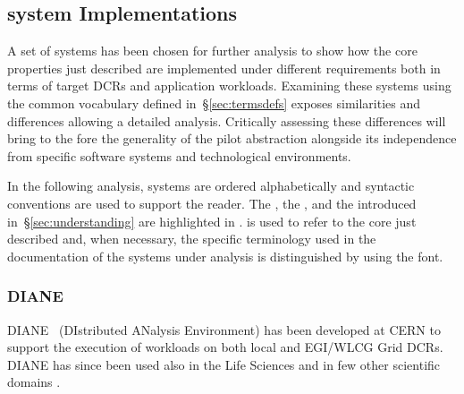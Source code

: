 \documentclass{sig-alternate}
\begin{document}
\subsection{\pilot system Implementations}
\label{sec:implementations}

A set of \pilot systems has been chosen for further analysis to show how the
core properties just described are implemented under different requirements both
in terms of target DCRs and application workloads. Examining these \pilot
systems using the common vocabulary defined in~\S\ref{sec:termsdefs} exposes
similarities and differences allowing a detailed analysis. Critically assessing
these differences will bring to the fore the generality of the pilot abstraction
alongside its independence from specific software systems and technological
environments.

In the following analysis, \pilot systems are ordered alphabetically and
syntactic conventions are used to support the reader. The , the , and the  introduced in~\S\ref{sec:understanding} are highlighted in
.   is used to refer to the core  just
described and, when necessary, the specific terminology used in the
documentation of the \pilot systems under analysis is distinguished by using the
 font.




%
\subsubsection{DIANE}
\label{sec:diane}

DIANE~\cite{Moscicki:908910} (DIstributed ANalysis Environment) has been
developed at CERN to support the execution of workloads on both local and
EGI/WLCG Grid DCRs. DIANE has since been used also in the Life Sciences
 and in few other scientific domains .
\end{document}
